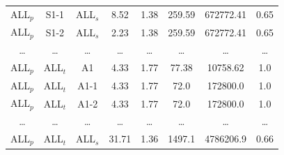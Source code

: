 \documentclass{article}
\begin{document}
\begin{tabular}{cccccccc}
ALL$_p$ & S1-1 & ALL$_s$ & 8.52 & 1.38 & 259.59 & 672772.41 & 0.65 \\
ALL$_p$ & S1-2 & ALL$_s$ & 2.23 & 1.38 & 259.59 & 672772.41 & 0.65 \\
\dots & \dots & \dots & \dots & \dots & \dots & \dots & \dots \\
ALL$_p$ & ALL$_t$ & A1 & 4.33 & 1.77 & 77.38 & 10758.62 & 1.0 \\
ALL$_p$ & ALL$_t$ & A1-1 & 4.33 & 1.77 & 72.0 & 172800.0 & 1.0 \\
ALL$_p$ & ALL$_t$ & A1-2 & 4.33 & 1.77 & 72.0 & 172800.0 & 1.0 \\
\dots & \dots & \dots & \dots & \dots & \dots & \dots & \dots \\
ALL$_p$ & ALL$_t$ & ALL$_s$ & 31.71 & 1.36 & 1497.1 & 4786206.9 & 0.66 \\
\bottomrule
\end{tabular}
\end{document}
